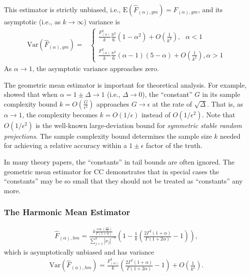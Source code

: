 \documentclass{sig-alternate}
\begin{document}
This estimator is strictly unbiased, i.e., $\text{E}\left(\hat{F}_{(\alpha),gm}\right) = F_{(\alpha),gm}$,  and its asymptotic (i.e., as $k\rightarrow \infty$) variance is
{\scriptsize \begin{align}\label{eqn_F_gm_var}
\text{Var}\left(\hat{F}_{(\alpha),gm}\right) =&\left\{
\begin{array}{l}
\frac{F_{(\alpha)}^2}{k}\frac{\pi^2}{6}\left(1-\alpha^2\right)+O\left(\frac{1}{k^2}\right), \ \ \   \alpha<1\\\\
\frac{F_{(\alpha)}^2}{k}\frac{\pi^2}{6}(\alpha-1)(5-\alpha)+O\left(\frac{1}{k^2}\right),    \alpha>1
\end{array}
\right.
\end{align}}
\noindent As $\alpha\rightarrow 1$, the asymptotic variance  approaches zero.

The geometric mean estimator is  important for theoretical analysis. For example, \cite{Article:Li_CC} showed that when $\alpha=1\pm\Delta\rightarrow 1$ (i.e., $\Delta\rightarrow0$), the ``constant'' $G$ in its sample complexity bound $ k = O\left(\frac{G}{\epsilon^2}\right)$ approaches $G\rightarrow \epsilon$ at the rate of $\sqrt{\Delta}$. That is, as $\alpha\rightarrow 1$, the complexity becomes $k = O\left(1/\epsilon\right)$ instead of  $O\left(1/\epsilon^2\right)$. Note that $O\left(1/\epsilon^2\right)$ is the well-known large-deviation bound for {\em symmetric stable random projections}. 
The sample complexity bound determines the sample size $k$ needed for achieving a relative accuracy within a $1\pm\epsilon$ factor of the truth.

In many theory papers, the ``constants'' in tail bounds are often ignored. The geometric mean estimator for CC demonstrates that in special cases the ``constants'' may be so small that they should not be treated as ``constants'' any more. 

\subsubsection{The Harmonic Mean Estimator}

\begin{align}\label{eqn_F_hm}
\hat{F}_{(\alpha),hm} = \frac{k\frac{\cos\left(\frac{\alpha\pi}{2}\right)}{\Gamma(1+\alpha)}}{\sum_{j=1}^k|x_j|^{-\alpha}}
\left(1- \frac{1}{k}\left(\frac{2\Gamma^2(1+\alpha)}{\Gamma(1+2\alpha)}-1\right) \right),
\end{align}
which is asymptotically unbiased and has variance
{\small\begin{align}\label{eqn_F_hm_var}
\text{Var}\left(\hat{F}_{(\alpha),hm}\right) = \frac{F^{2}_{(\alpha)}}{k}\left(\frac{2\Gamma^2(1+\alpha)}{\Gamma(1+2\alpha)}-1\right) + O\left(\frac{1}{k^2}\right).
\end{align}}
\end{document}
